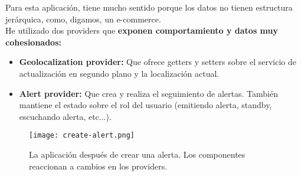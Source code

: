 Para esta aplicación, tiene mucho sentido porque los datos no tienen estructura jerárquica, como, digamos, un e-commerce. \\
He utilizado dos providers que \textbf{exponen comportamiento y datos muy cohesionados:}
\begin{itemize}
	\item \textbf{Geolocalization provider:} Que ofrece getters y setters sobre el servicio de actualización en segundo plano y la localización actual.
	\item \textbf{Alert provider:} Que crea y realiza el seguimiento de alertas. También mantiene el estado sobre el rol del usuario (emitiendo alerta, standby, escuchando alerta, etc...).
\end{itemize}

\begin{figure}[H]\label{fig:alert}
	\centering	
	\texttt{[image: create-alert.png]}
	\caption{La aplicación después de crear una alerta. Los componentes reaccionan a cambios en los providers.}
	\end{figure}


